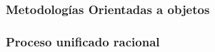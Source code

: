 \documentclass[12pt,twoside]{article}
\begin{document}
\subsubsection{Metodologías Orientadas a objetos}
\subsubsection{Proceso unificado racional}


\end{document}
